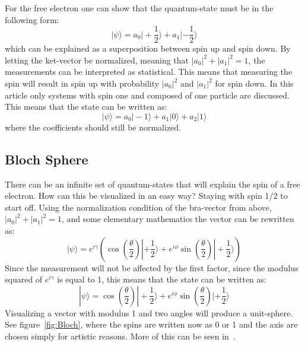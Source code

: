 \documentclass[
  utf8,%
  parskip,%
  largesmallcaps,intlimits,widermath,%
  sharecounter,nobreak,definition=marks,%
  noparts%
]{rtthesis}
\begin{document}
For the free electron one can show that the quantum-state must be in the following form: $$|\psi\rangle=a_0|+\frac{1}{2}\rangle+a_1|-\frac{1}{2}\rangle$$ which can be explained as a superposition between spin up and spin down.
By letting the ket-vector be normalized, meaning that $|a_0|^2+|a_1|^2=1$, the measurements can be interpreted as statistical. This means that measuring the spin will result in spin up with probability $|a_0|^2$ and $|a_1|^2$ for spin down.  In this article only systems with spin one and composed of one particle are discussed. This means that the state can be written as: $$|\psi\rangle=a_0|-1\rangle+a_1|0\rangle+a_2|1\rangle$$ where the coefficients should still be normalized. 
\subsection{Bloch Sphere}\label{Bloch Sphere}
There can be an infinite set of quantum-states that will explain the spin of a free electron. How can this be visualized in an easy way? Staying with spin 1/2 to start off. Using the normalization condition of the bra-vector from above, $|a_0|^2+|a_1|^2=1$, and some elementary mathematics the vector can be rewritten as:
$$|\psi\rangle=e^{i\gamma}(\cos(\frac{\theta}{2})|+\frac{1}{2}\rangle+e^{i\phi}\sin(\frac{\theta}{2})|+\frac{1}{2}\rangle)$$
Since the measurement will not be affected by the first factor, since the modulus squared of $e^{i\gamma}$ is equal to 1, this means that the state can be written as:
$$|\psi\rangle=\cos(\frac{\theta}{2})|+\frac{1}{2}\rangle+e^{i\phi}\sin(\frac{\theta}{2})|+\frac{1}{2}\rangle$$
Visualizing a vector with modulus 1 and two angles will produce a unit-sphere. See figure~\ref{fig:Bloch}, where the spins are written now as 0 or 1 and the axis are chosen simply for artistic reasons. More of this can be seen in~\cite{Nielsen:2010}.
\end{document}
